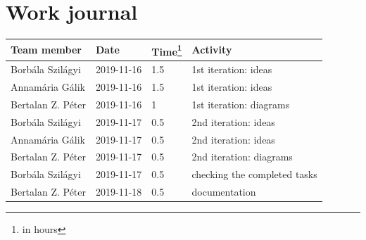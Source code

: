 \documentclass[a4paper]{article}
\begin{document}
\section{Work journal}

\begin{tabularx}{\textwidth}{l l l X}
	\toprule
	Team member & Date & Time\footnote{in hours} & Activity \\ \midrule

	Borbála Szilágyi  & 2019-11-16 & 1.5 & 1st iteration: ideas         \\
	Annamária Gálik   & 2019-11-16 & 1.5 & 1st iteration: ideas         \\
	Bertalan Z. Péter & 2019-11-16 & 1   & 1st iteration: diagrams      \\
	Borbála Szilágyi  & 2019-11-17 & 0.5 & 2nd iteration: ideas         \\
	Annamária Gálik   & 2019-11-17 & 0.5 & 2nd iteration: ideas         \\
	Bertalan Z. Péter & 2019-11-17 & 0.5 & 2nd iteration: diagrams      \\
	Borbála Szilágyi  & 2019-11-17 & 0.5 & checking the completed tasks \\
	Bertalan Z. Péter & 2019-11-18 & 0.5 & documentation                \\
	\bottomrule
\end{tabularx}

\clearpage
\printglossaries
\end{document}
